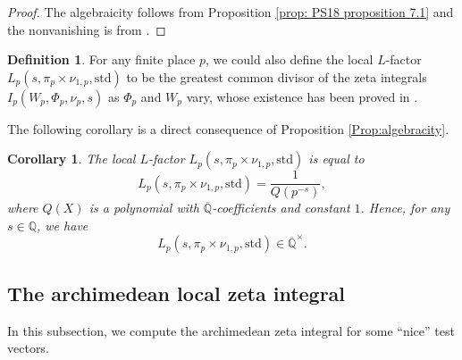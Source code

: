 \documentclass[11pt, a4paper]{amsart}
\theoremstyle{plain}
\newtheorem{corollary}[theorem]{Corollary}
\theoremstyle{definition}
\newtheorem{definition}[theorem]{Definition}
\numberwithin{equation}{section}
\def\QQ{\mathbb{Q}}
\begin{document}
\begin{proof}
The algebraicity follows from Proposition \ref{prop: PS18 proposition 7.1} and the nonvanishing is from \cite[Lemma 7.4]{PS18}. 
\end{proof}

\begin{definition}
    For any finite place $p$, we could also define the local $L$-factor $L_{p}(s, \pi_{p} \times \nu_{1, p}, \mathrm{std})$ to be the greatest common divisor of the zeta integrals $I_{p}(W_{p}, \Phi_{p}, \nu_{p}, s)$ as $\Phi_{p}$ and $W_{p}$ vary, whose existence has been proved in \cite{Baruch97}. 
\end{definition}

The following corollary is a direct consequence of Proposition \ref{Prop:algebracity}. 

\begin{corollary}
\label{corollary: local L-factor algebraicity}
The local $L$-factor $L_{p}(s, \pi_{p} \times \nu_{1, p}, \mathrm{std})$ is equal to 
\begin{equation*}
    L_{p}(s, \pi_{p} \times \nu_{1, p}, \mathrm{std}) = \frac{1}{Q(p^{-s})},
\end{equation*}
where $Q(X)$ is a polynomial with $\overline{\QQ}$-coefficients and constant $1$. 
Hence, for any $s \in \QQ$, we have 
\begin{equation*}
    L_{p}(s, \pi_{p} \times \nu_{1, p}, \mathrm{std}) \in \overline{\QQ}^{\times}. 
\end{equation*}
\end{corollary}

\subsection{The archimedean local zeta integral}
\label{SS: arch local integral}
In this subsection, we compute the archimedean zeta integral for some ``nice'' test vectors. 
\end{document}

